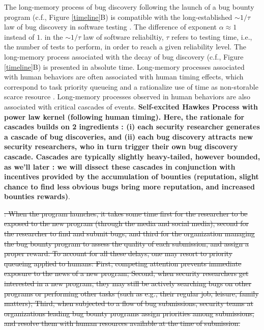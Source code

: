 The long-memory process of bug discovery following the launch of a bug bounty program (c.f., Figure \ref{timeline}B) is compatible with the long-established $\sim 1/\tau$ law of bug discovery in software testing \cite{adams1984textordfeminineoptimizing}. The difference of exponent $\alpha \approx 1$ instead of $1$. in the $\sim 1/\tau$ law of software reliabiltiy, $\tau$ refers to testing time, i.e., the number of tests to perform, in order to reach a given reliability level. The long-memory process associated with the decay of bug discovery (c.f., Figure \ref{timeline}B) is presented in absolute time. Long-memory processes associated with human behaviors are often associated with  human timing effects, which correspond to task priority queueing and a rationalize use of time as non-storable scarce resource \cite{maillart2011quantification}. Long-memory processes observed in human behaviors are also associated with critical cascades of events. {\bf Self-excited Hawkes Process with power law kernel (following human timing)\cite{sornette2014much}. Here, the rationale for cascades builds on 2 ingredients : (i) each security researcher generates a cascade of bug discoveries, and (ii) each bug discovery attracts new security researchers, who in turn trigger their own bug discovery cascade. Cascades are typically slightly heavy-tailed, however bounded, as we'll later : we will dissect these cascades in conjunction with incentives provided by the accumulation of bounties (reputation, slight chance to find less obvious bugs bring more reputation, and increased bounties rewards)}.


\sout{: When the program launches, it takes some time first for the researcher to be exposed to the new program (through the media and social media), second for the researcher to find and submit bugs, and third for the organization managing the bug bounty program to assess the quality of each submission, and assign a proper reward. To account for all these delays, one may resort to priority queueing applied to humans: First, competing attention prevents immediate exposure to the news of a new program; Second, when security researchers get interested in a new program, they may still be actively searching bugs on other programs or performing other tasks (such as e.g., their regular job, leisure, family matters); Third, when subjected to a flow of bug submissions, security teams at organizations leading bug bounty programs assign priorities among submissions, and resolve them with human resources available at the time of submission. }

